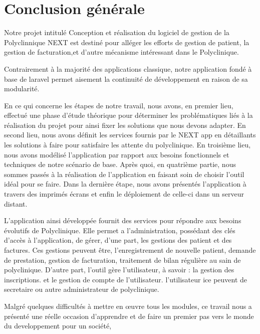 \chapter*{Conclusion générale}

Notre projet intitulé Conception et réalisation du logiciel de gestion de la  Polyclinnique  NEXT est destiné
pour alléger les efforts de gestion de patient, la gestion de facturation,et d'autre mécanisme intéressant dans le Polyclinique.

\medskip

Contrairement à la majorité des applications classique, notre application fondé à base de laravel permet aisement la continuité de développement en raison de sa modularité.
\medskip

En ce qui concerne les étapes de notre travail, nous avons, en premier lieu, effectué
une phase d’étude théorique pour déterminer les problématiques liés à la réalisation
du projet pour ainsi fixer les solutions que nous devons adapter. En second lieu, nous
avons définit les services fournis par le NEXT app en détaillants les solutions à
faire pour satisfaire les attente du polyclinique. En troisième lieu, nous
avons modélisé l’application par rapport aux besoins fonctionnels et techniques de notre
scénario de base. Après quoi, en quatrième partie, nous sommes passés à la réalisation de
l’application en faisant soin de choisir l'outil idéal pour se faire. Dans la dernière étape, nous avons présentés l'application à travers des imprimés écrans et enfin le déploiement de celle-ci dans un serveur distant.
\medskip

L'application ainsi développée fournit des services pour répondre aux besoins évolutifs de Polyclinique. Elle permet a l'administration, possédant des clés d'accès à l'application, de gérer, d'une part, les gestions des patient et des factures. Ces gestions peuvent être, l'enregistrement de nouvelle patient, demande de prestation, gestion de facturation, traitement de bilan régulière au sain de polyclinique.
D'autre part, l'outil gère l'utilisateur, à savoir : la gestion des inscriptions. et le gestion de compte de l'utilisateur. l'utilisateur ice peuvent de secretaire ou autre administrateur de polyclinique.
\medskip

Malgré quelques difficultés à mettre en œuvre tous les modules, ce travail nous a présenté une
réelle occasion d'apprendre et de faire un premier pas vers le monde du developpement pour un société,
\medskip

